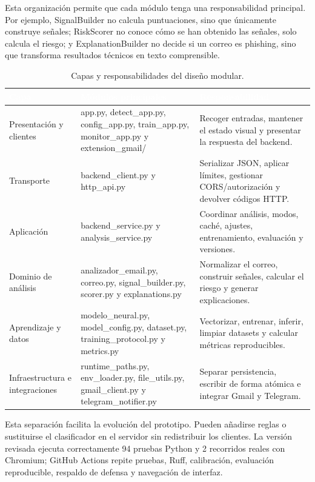 \documentclass[11pt,a4paper,oneside]{report}
\begin{document}
Esta organización permite que cada módulo tenga una responsabilidad principal. Por ejemplo, SignalBuilder no calcula puntuaciones, sino que únicamente construye señales; RiskScorer no conoce cómo se han obtenido las señales, solo calcula el riesgo; y ExplanationBuilder no decide si un correo es phishing, sino que transforma resultados técnicos en texto comprensible.

\begingroup
\begin{table}[H]
  \centering
  \small
  \caption{Capas y responsabilidades del diseño modular.}
  \label{tab:5-4}
  \begin{tabularx}{\textwidth}{|X|X|X|}
    \hline
    \rowcolor{uemcgreen}
    \textcolor{white}{\textbf{Capa}} & \textcolor{white}{\textbf{Módulos principales}} & \textcolor{white}{\textbf{Responsabilidad}} \\
    \hline
    Presentación y clientes & app.py, detect\_app.py, config\_app.py, train\_app.py, monitor\_app.py y extension\_gmail/ & Recoger entradas, mantener el estado visual y presentar la respuesta del backend. \\
    \hline
    \rowcolor{tablelight}
    Transporte & backend\_client.py y http\_api.py & Serializar JSON, aplicar límites, gestionar CORS/autorización y devolver códigos HTTP. \\
    \hline
    Aplicación & backend\_service.py y analysis\_service.py & Coordinar análisis, modos, caché, ajustes, entrenamiento, evaluación y versiones. \\
    \hline
    \rowcolor{tablelight}
    Dominio de análisis & analizador\_email.py, correo.py, signal\_builder.py, scorer.py y explanations.py & Normalizar el correo, construir señales, calcular el riesgo y generar explicaciones. \\
    \hline
    Aprendizaje y datos & modelo\_neural.py, model\_config.py, dataset.py, training\_protocol.py y metrics.py & Vectorizar, entrenar, inferir, limpiar datasets y calcular métricas reproducibles. \\
    \hline
    \rowcolor{tablelight}
    Infraestructura e integraciones & runtime\_paths.py, env\_loader.py, file\_utils.py, gmail\_client.py y telegram\_notifier.py & Separar persistencia, escribir de forma atómica e integrar Gmail y Telegram. \\
    \hline
  \end{tabularx}
\end{table}
\endgroup

Esta separación facilita la evolución del prototipo. Pueden añadirse reglas o sustituirse el clasificador en el servidor sin redistribuir los clientes. La versión revisada ejecuta correctamente 94 pruebas Python y 2 recorridos reales con Chromium; GitHub Actions repite pruebas, Ruff, calibración, evaluación reproducible, respaldo de defensa y navegación de interfaz.
\end{document}
